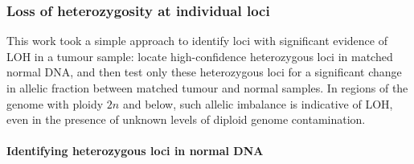 \documentclass[dissertation.tex]{subfiles}
\begin{document}
\subsubsection{Loss of heterozygosity at individual loci}

This work took a simple approach to identify loci with significant evidence of \gls{LOH} in a tumour sample: locate high-confidence heterozygous loci in matched normal DNA, and then test only these heterozygous loci for a significant change in allelic fraction between matched tumour and normal samples.  In regions of the genome with ploidy $2n$ and below, such allelic imbalance is indicative of \gls{LOH}, even in the presence of unknown levels of diploid genome contamination.

\paragraph{Identifying heterozygous loci in normal DNA}
\end{document}
